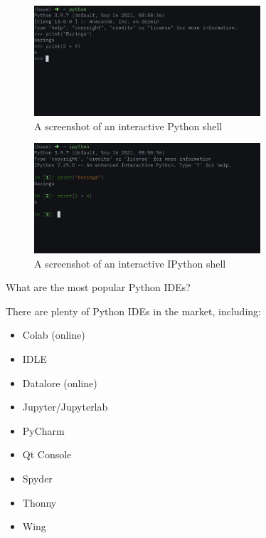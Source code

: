 \documentclass[a4paper,11pt]{book}
\newcommand{\question}[1]{%
    \begin{tcolorbox}[colback=comp_c!10,colframe=comp_c,sidebyside align=top,width=\linewidth,before skip=1ex]
        #1
    \end{tcolorbox}
    \switchcolumn%
}
\newcommand{\note}[1]{%
    \begin{tcolorbox}[colback=white!0,colframe=white!10,width=\linewidth,before skip=1ex]
        #1
    \end{tcolorbox}
}
\begin{document}
\begin{figure}[!htbp]
	\centering
	\includegraphics[width=0.75\textwidth]{python_session}
	\caption{A screenshot of an interactive Python shell}
	\label{fig:python_session}
\end{figure}
\clearpage

\begin{figure}[!htbp]
	\centering
	\includegraphics[width=0.75\textwidth]{ipython_session}
	\caption{A screenshot of an interactive IPython shell}
	\label{fig:ipython_session}
\end{figure}

\begin{paracol}{2}
	\question{\raggedright What are the most popular Python IDEs?}
	\note{There are plenty of Python IDEs in the market, including:
	
	\begin{itemize}
		\item Colab (online)
		\item IDLE
		\item Datalore (online)
		\item Jupyter/Jupyterlab 
		\item PyCharm
		\item Qt Console
		\item Spyder
		\item Thonny
		\item Wing
	\end{itemize}

	}
\end{paracol}
\end{document}
